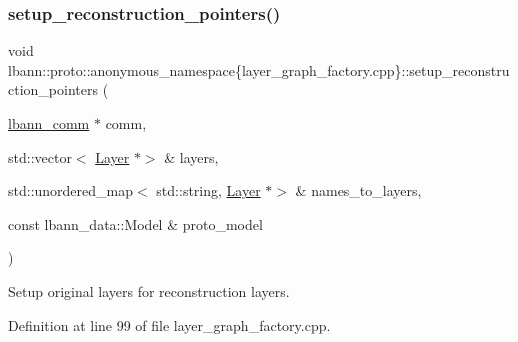 \mbox{\label{namespacelbann_1_1proto_1_1anonymous__namespace_02layer__graph__factory_8cpp_03_ac0c3ac49d16d6926308c336149a2f039}} 
\subsubsection{\texorpdfstring{setup\+\_\+reconstruction\+\_\+pointers()}{setup\_reconstruction\_pointers()}}
{\footnotesize\ttfamily void lbann\+::proto\+::anonymous\+\_\+namespace\{layer\+\_\+graph\+\_\+factory.\+cpp\}\+::setup\+\_\+reconstruction\+\_\+pointers (\begin{DoxyParamCaption}\item[{\hyperlink{classlbann_1_1lbann__comm}{lbann\+\_\+comm} $\ast$}]{comm,  }\item[{std\+::vector$<$ \hyperlink{classlbann_1_1Layer}{Layer} $\ast$$>$ \&}]{layers,  }\item[{std\+::unordered\+\_\+map$<$ std\+::string, \hyperlink{classlbann_1_1Layer}{Layer} $\ast$$>$ \&}]{names\+\_\+to\+\_\+layers,  }\item[{const lbann\+\_\+data\+::\+Model \&}]{proto\+\_\+model }\end{DoxyParamCaption})}

Setup original layers for reconstruction layers. 

Definition at line 99 of file layer\+\_\+graph\+\_\+factory.\+cpp.


